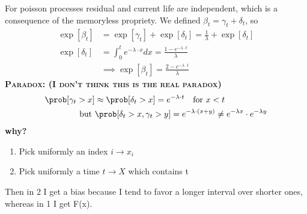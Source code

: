 For poisson processes residual and current life are independent, which is a consequence of the memoryless propriety. We defined $\beta_t=\gamma_t + \delta_t$, so
\begin{equation}\begin{split}
\exp[\beta_t]&=\exp[\gamma_t] + \exp[\delta_t] = \frac{1}{\lambda} + \exp[\delta_t]\\
\exp[\delta_t]&= \int_0^t e^{-\lambda \cdot x} dx = \frac{1-e^{-\lambda \cdot t}}{\lambda} \\
&\implies \exp[\beta_t]= \frac{2-e^{-\lambda \cdot t}}{\lambda}
\end{split}\end{equation}
\textbf{\textsc{Paradox: (I don't think this is the real paradox)}}
\begin{equation}
	\begin{split}
		\prob[\gamma_t > x] &\approx \prob[\delta_t>x] = e^{-\lambda \cdot t} \quad \text{for }x<t \\
		\text{but } &\prob[\delta_t >x , \gamma _ t > y ] = e^{-\lambda \cdot (x+y)} \neq e^{-\lambda x} \cdot e^{-\lambda y}
	\end{split}
\end{equation}
\textbf{why?}
\begin{enumerate}
	\item Pick uniformly an index $i \to x_i $
	\item Pick uniformly a time $t \to X$ which contains t
\end{enumerate}

Then in 2 I get a bias because I tend to favor a longer interval over shorter ones, whereas in 1 I get F(x).

